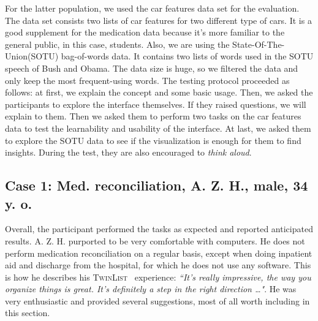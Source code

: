 \documentclass{chi2009}
\newcommand{\TwinList}{\textsc{TwinList}}
\begin{document}
For the latter population, we used the car features data set for the evaluation. The data set consists two lists of car features for two different type of cars. It is a good supplement for the medication data because it's more familiar to the general public, in this case, students. Also, we are using the State-Of-The-Union(SOTU) bag-of-words data. It contains two lists of words used in the SOTU speech of Bush and Obama. The data size is huge, so we filtered the data and only keep the most frequent-using words. The testing protocol proceeded as follows: at first, we explain the concept and some basic usage. Then, we asked the participants to explore the interface themselves. If they raised questions, we will explain to them. Then we asked them to perform two tasks on the car features data to test the learnability and usability of the interface. At last, we asked them to explore the SOTU data to see if the visualization is enough for them to find insights. During the test, they are also encouraged to \textit{think aloud}.

\subsection{Case 1: Med. reconciliation, A. Z. H., male, 34 y. o.}
Overall, the participant performed the tasks as expected and reported anticipated results. A. Z. H. purported to be very comfortable with computers. He does not perform medication reconciliation on a regular basis, except when doing inpatient aid and discharge from the hospital, for which he does not use any software. This is how he describes his \TwinList~ experience: \textit{``It's really impressive, the way you organize things is great. It's definitely a step in the right direction \dots"}. He was very enthusiastic and provided several suggestions, most of all worth including in this section. 
\end{document}
